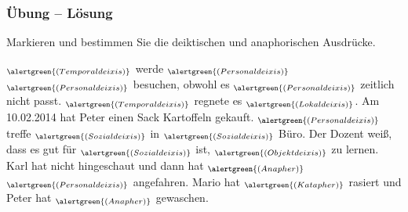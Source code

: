 
\begin{frame}
\frametitle{Übung -- Lösung}

Markieren und bestimmen Sie die deiktischen und anaphorischen Ausdrücke.
	
		\ea {} $_{\alertgreen{(Temporaldeixis)}}$ werde  $_{ \alertgreen{(Personaldeixis)}}$  $_{\alertgreen{(Personaldeixis)}}$ besuchen, obwohl es  $_{\alertgreen{(Personaldeixis)}}$ zeitlich nicht passt.
		\ex {} $_{\alertgreen{(Temporaldeixis)}}$ regnete es  $_{\alertgreen{(Lokaldeixis)}}$.
		\ex Am 10.02.2014 hat Peter einen Sack Kartoffeln gekauft.
		\ex {} $_{\alertgreen{(Personaldeixis)}}$ treffe  $_{\alertgreen{(Sozialdeixis)}}$ in  $_{\alertgreen{(Sozialdeixis)}}$ Büro.
		\ex Der Dozent wei\ss{}, dass es gut für  $_{\alertgreen{(Sozialdeixis)}}$ ist,  $_{\alertgreen{(Objektdeixis)}}$ zu lernen.
		\ex Karl hat nicht hingeschaut und dann hat  $_{\alertgreen{(Anapher)}}$  $_{\alertgreen{(Personaldeixis)}}$ angefahren.
		\ex Mario hat  $_{\alertgreen{(Katapher)}}$ rasiert und Peter hat  $_{\alertgreen{(Anapher)}}$ gewaschen.
		\z

\end{frame}